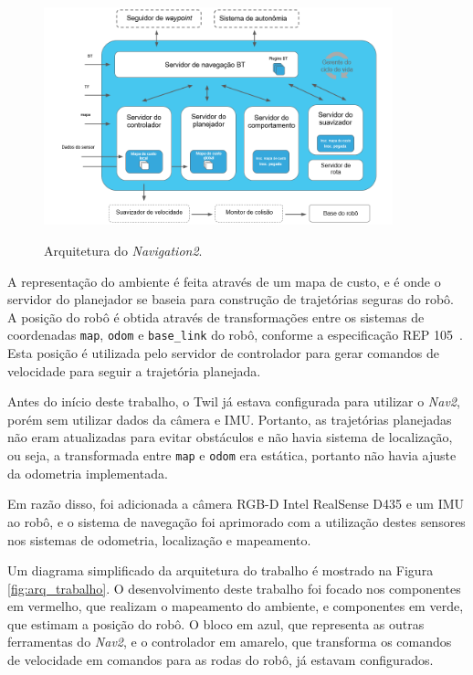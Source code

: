 \documentclass[repeatfields,xlists,xpacks,oneside,yearsonly]{ufrgscca}
\begin{document}
\begin{figure}[h]
    {
        \centering
        \caption{Arquitetura do \textit{Navigation2}.}
        \label{fig:nav2_arc}
        \includegraphics[width=0.9\textwidth]{nav2_architecture_trad.png}\\
    }
    {} %
\end{figure}

A representação do ambiente é feita através de um mapa de custo, e é
onde o servidor do planejador se baseia para construção de
trajetórias seguras do robô. A posição do robô é obtida através de
transformações entre os sistemas de coordenadas \texttt{map},
\texttt{odom} e \texttt{base\_link} do robô, conforme a especificação
REP 105~\cite{rep_105}. Esta posição é utilizada pelo servidor de
controlador para gerar comandos de velocidade para seguir a
trajetória planejada.

Antes do início deste trabalho, o Twil já estava configurada para
utilizar o \textit{Nav2}, porém sem utilizar dados da câmera e IMU.
Portanto, as trajetórias planejadas não eram atualizadas para evitar
obstáculos e não havia sistema de localização, ou seja, a
transformada entre \texttt{map} e \texttt{odom} era estática,
portanto não havia ajuste da odometria implementada.

Em razão disso, foi adicionada a câmera RGB-D Intel RealSense D435 e
um IMU ao robô, e o sistema de navegação foi aprimorado com a
utilização destes sensores nos sistemas de odometria, localização e
mapeamento.

Um diagrama simplificado da arquitetura do trabalho é mostrado na
Figura \ref{fig:arq_trabalho}. O desenvolvimento deste trabalho foi
focado nos componentes em vermelho, que realizam o mapeamento do
ambiente, e componentes em verde, que estimam a posição do robô. O
bloco em azul, que representa as outras ferramentas do \textit{Nav2},
e o controlador em amarelo, que transforma os comandos de velocidade
em comandos para as rodas do robô, já estavam configurados.
\end{document}

